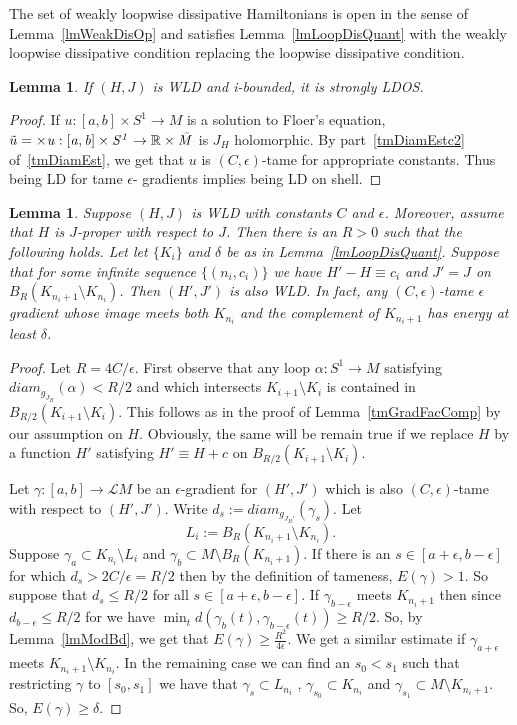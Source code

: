 \documentclass[11pt]{amsart}
\newcommand{\R}{\mathbb{R}}
\newtheorem{lm}[tm]{Lemma}
\theoremstyle{definition}
\theoremstyle{remark}
\begin{document}
The set of weakly loopwise dissipative Hamiltonians is open in the sense of Lemma~\ref{lmWeakDisOp} and satisfies Lemma~\ref{lmLoopDisQuant} with the weakly loopwise dissipative condition replacing the loopwise dissipative condition.

\begin{lm}\label{lmWLDLDOS}
If $(H,J)$ is WLD and i-bounded, it is strongly LDOS.
\end{lm}
\begin{proof}
If $u:[a,b]\times S^1\to M$ is a solution to Floer's equation, $\tilde{u}=\it\times u:[a,b]\times S^1\to \R\times\tilde{M}$ is $J_H$ holomorphic. By part~\ref{tmDiamEstc2} of~\ref{tmDiamEst}, we get that $u$ is $(C,\epsilon)$-tame for appropriate constants. Thus being LD for tame $\epsilon$- gradients implies being LD on shell.
\end{proof}
\begin{lm}\label{lmWeakStepDis}
Suppose $(H,J)$ is WLD with constants $C$ and $\epsilon$. Moreover, assume that $H$ is $J$-proper with respect to $J$. Then there is an $R>0$ such that the following holds. Let let $\{K_i\}$ and $\delta$ be as in  Lemma~\ref{lmLoopDisQuant}. Suppose that for some infinite sequence $\{(n_i,c_i)\}$ we have $H'-H\equiv c_i$ and $J'=J$ on $B_R(K_{n_i+1}\setminus K_{n_i})$. Then $(H',J')$ is also WLD. In fact, any $(C,\epsilon)$-tame $\epsilon$ gradient whose image meets both $K_{n_i}$ and the complement of $K_{n_i+1}$ has energy at least $\delta$.
\end{lm}

\begin{proof}
 Let $R=4C/\epsilon$.  First observe that any loop $\alpha:S^1\to M$ satisfying $diam_{g_{J_{H}}}(\alpha)< R/2$ and which intersects $K_{i+1}\setminus K_i$  is contained in $B_{R/2}(K_{i+1}\setminus K_i)$. This follows as in the proof of Lemma~\ref{tmGradFacComp} by our assumption on $H$. Obviously, the same will be remain true if we replace $H$ by a function $H'$ satisfying $H'\equiv H+c $ on $B_{R/2}(K_{i+1}\setminus K_i).$

 Let $\gamma:[a,b]\to \mathcal{L}M$ be an $\epsilon$-gradient for $(H',J')$ which is also $(C,\epsilon)$-tame with respect to $(H',J')$.  Write $d_s:= diam_{g_{J_H'}}(\gamma_s)$.  Let
 \[
 L_i:=B_R(K_{n_i+1}\setminus K_{n_i}).
 \]
 Suppose $\gamma_a\subset K_{n_i}\setminus L_i$ and $\gamma_b\subset M\setminus B_R(K_{n_i+1})$. If there is an $s\in[a+\epsilon,b-\epsilon]$  for which $d_s> 2C/\epsilon=R/2$ then by the definition of tameness, $E(\gamma)>1 $. So suppose that $d_s\leq R/2$ for all $s\in[a+\epsilon,b-\epsilon]$. If $\gamma_{b-\epsilon}$ meets $K_{n_i+1}$ then since  $d_{b-\epsilon}\leq R/2$ for we have $\min_td(\gamma_{b}(t),\gamma_{b-\epsilon}(t))\geq R/2$. So, by Lemma~\ref{lmModBd}, we get that $E(\gamma)\geq\frac{R^2}{4\epsilon}$. We get a similar estimate if $\gamma_{a+\epsilon}$ meets $K_{n_i+1}\setminus K_{n_i}$.  In the remaining case we can find an $s_0<s_1$ such that restricting $\gamma$ to $[s_0,s_1]$ we have that $\gamma_s\subset L_{n_i}$ , $\gamma_{s_0}\subset K_{n_i}$ and $\gamma_{s_1}\subset M\setminus K_{n_i+1}$. So, $E(\gamma)\geq\delta$.
\end{proof}
\end{document}
